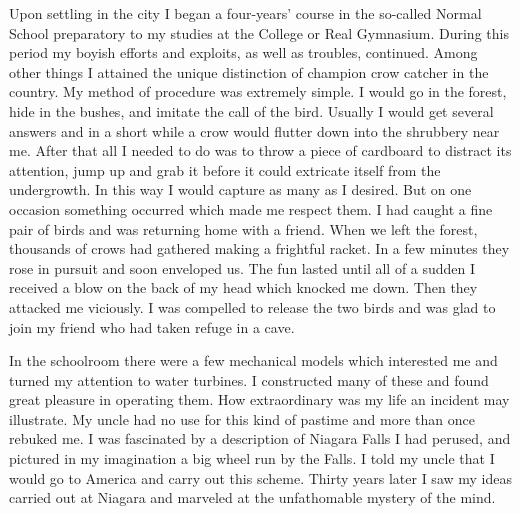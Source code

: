 \documentclass[a4paper,12pt,english,twoside,openright]{memoir}
\begin{document}
	Upon settling in the city I began a four-years' course in the so-called Normal School preparatory 
	to my studies at the College or Real Gymnasium.  During this period my boyish efforts and 
	exploits, as well as troubles, continued.  Among other things I attained the unique distinction of 
	champion crow catcher in the country.  My method of procedure was extremely simple.  I would 
	go in the forest, hide in the bushes, and imitate the call of the bird.  Usually I would get several 
	answers and in a short while a crow would flutter down into the shrubbery near me.  After that all I 
	needed to do was to throw a piece of cardboard to distract its attention, jump up and grab it 
	before it could extricate itself from the undergrowth.  In this way I would capture as many as I 
	desired.  But on one occasion something occurred which made me respect them.  I had caught a 
	fine pair of birds and was returning home with a friend.  When we left the forest, thousands of 
	crows had gathered making a frightful racket.  In a few minutes they rose in pursuit and soon 
	enveloped us.  The fun lasted until all of a sudden I received a blow on the back of my head 
	which knocked me down.  Then they attacked me viciously.  I was compelled to release the two 
	birds and was glad to join my friend who had taken refuge in a cave.  
	
	In the schoolroom there were a few mechanical models which interested me and turned my 
	attention to water turbines.  I constructed many of these and found great pleasure in operating 
	them.  How extraordinary was my life an incident may illustrate.  My uncle had no use for this kind 
	of pastime and more than once rebuked me.  I was fascinated by a description of Niagara Falls I 
	had perused, and pictured in my imagination a big wheel run by the Falls.  I told my uncle that I 
	would go to America and carry out this scheme.  Thirty years later I saw my ideas carried out at 
	Niagara and marveled at the unfathomable mystery of the mind.  
	
\end{document}

